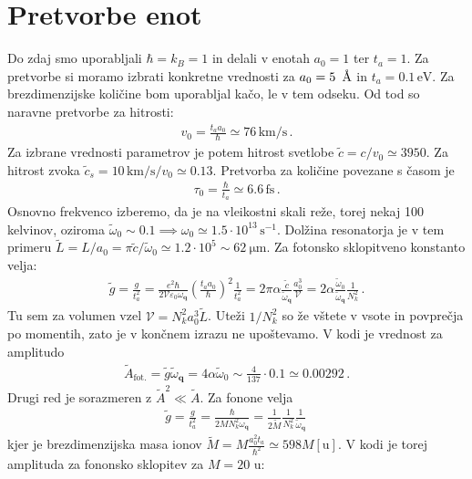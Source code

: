 \documentclass[a4paper,10pt]{article}
\renewcommand{\vec}[1]{\mathbf{#1}}
\begin{document}
\section{Pretvorbe enot}
Do zdaj smo uporabljali $\hbar=k_B=1$ in delali v enotah $a_0=1$ ter $t_a=1$. Za pretvorbe si moramo izbrati konkretne vrednosti za $a_0 = 5\, \textup{~\AA}$ in $t_a = 0.1\, \text{eV}$. Za brezdimenzijske količine bom uporabljal kačo, le v tem odseku. Od tod so naravne pretvorbe za hitrosti: 
\begin{align}
  v_0 = \frac{t_a a_0}{\hbar} \simeq 76 \,\text{km/s}\,.
\end{align}
Za izbrane vrednosti parametrov je potem hitrost svetlobe $\tilde{c} = c/v_0 \simeq 3950$. Za hitrost zvoka $\tilde{c}_s= 10 \,\text{km/s} / v_0 \simeq 0.13$. Pretvorba za količine povezane s časom je 
\begin{align}
 \tau_0 = \frac{\hbar}{t_a} \simeq 6.6 \, \text{fs}\,.
\end{align}
Osnovno frekvenco izberemo, da je na vleikostni skali reže, torej nekaj 100 kelvinov, oziroma $\tilde{\omega}_0 \sim 0.1 \implies \omega_0 \simeq 1.5\cdot 10^{13}\,\text{s}^{-1}$. Dolžina resonatorja je v tem primeru $\tilde{L} = L / a_0 = \pi \tilde{c} / \tilde{\omega}_0 \simeq 1.2 \cdot 10^5 \sim \qty{62}{\micro\metre}$. Za fotonsko sklopitveno konstanto velja: 
\begin{align}
  \tilde{g} = \frac{g}{t_a^2} = \frac{e^2\hbar}{2\mathcal{V}\varepsilon_0\omega_\vec{q}} \left(\frac{t_a a_0}{\hbar}\right)^2\frac{1}{t_a^2} = 2\pi \alpha \frac{\tilde{c}}{\tilde{\omega}_\vec{q}} \frac{a_0^3}{\mathcal{V}} = 2 \alpha \frac{\tilde{\omega}_0}{\tilde{\omega}_\vec{q}}\frac{1}{N_k^2}\,.
\end{align}
Tu sem za volumen vzel $\mathcal{V} = N_k^2a_0^3 \tilde{L}$. Uteži $1/N_k^2$ so že vštete v vsote in povprečja po momentih, zato je v končnem izrazu ne upoštevamo. V kodi je vrednost za amplitudo 
\begin{align}
  \tilde{A}_{\text{fot.}} = \tilde{g}\tilde{\omega}_\vec{q} =4 \alpha \tilde{\omega}_0 \sim \frac{4}{137} \cdot 0.1 \simeq 0.00292\,.
\end{align} 
Drugi red je sorazmeren z $\tilde{A}^2 \ll \tilde{A}$. Za fonone velja 
\begin{align}
  \tilde{g} = \frac{g}{t_a^2} = \frac{\hbar}{2MN_k^2 \omega_\vec{q}} = \frac{1}{2\tilde{M}} \frac{1}{N_k^2}\frac{1}{\tilde{\omega}_\vec{q}}\,
\end{align}
kjer je brezdimenzijska masa ionov $\tilde{M} = M \frac{a_0^2 t_a}{\hbar^2} \simeq 598 M[\text{u}]$. V kodi je torej amplituda za fononsko sklopitev za $M = 20$ u:
\end{document}

